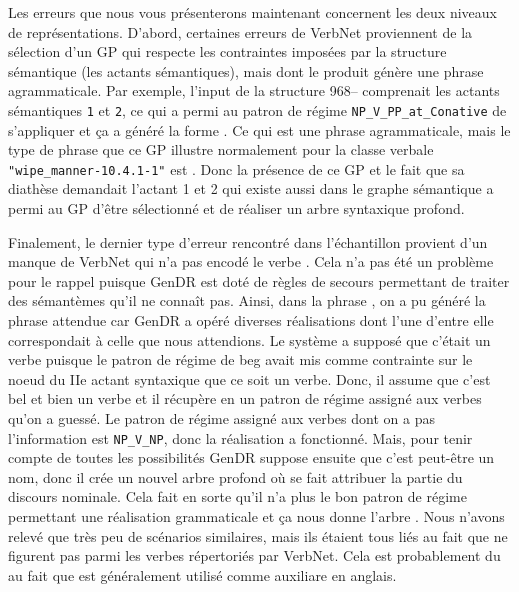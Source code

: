 Les erreurs que nous vous présenterons maintenant concernent les deux niveaux de représentations. D'abord, certaines erreurs de VerbNet proviennent de la sélection d'un \ac{GP} qui respecte les contraintes imposées par la structure sémantique (les actants sémantiques), mais dont le produit génère une phrase agrammaticale. Par exemple, l'input de la structure 968-- comprenait les actants sémantiques \texttt{1} et \texttt{2}, ce qui a permi au patron de régime \texttt{NP\_V\_PP\_at\_Conative} de s'appliquer et ça a généré la forme . Ce qui est une phrase agrammaticale, mais le type de phrase que ce \ac{GP} illustre normalement pour la classe verbale \texttt{"wipe\_manner-10.4.1-1"} est . Donc la présence de ce \ac{GP} et le fait que sa diathèse demandait l'actant 1 et 2 qui existe aussi dans le graphe sémantique a permi au \ac{GP} d'être sélectionné et de réaliser un arbre syntaxique profond.


Finalement, le dernier type d'erreur rencontré dans l'échantillon provient d'un manque de VerbNet qui n'a pas encodé le verbe . Cela n'a pas été un problème pour le rappel puisque GenDR est doté de règles de secours permettant de traiter des sémantèmes qu'il ne connaît pas. Ainsi, dans la phrase , on a pu généré la phrase attendue car GenDR a opéré diverses réalisations dont l'une d'entre elle correspondait à celle que nous attendions. Le système a supposé que c'était un verbe puisque le patron de régime de beg avait mis comme contrainte sur le noeud du IIe actant syntaxique que ce soit un verbe. Donc, il assume que c'est bel et bien un verbe et il récupère en un patron de régime assigné aux verbes qu'on a guessé. Le patron de régime assigné aux verbes dont on a pas l'information est \texttt{NP\_V\_NP}, donc la réalisation a fonctionné. Mais, pour tenir compte de toutes les possibilités GenDR suppose ensuite que c'est peut-être un nom, donc il crée un nouvel arbre profond où  se fait attribuer la partie du discours nominale. Cela fait en sorte qu'il n'a plus le bon patron de régime permettant une réalisation grammaticale et ça nous donne l'arbre . Nous n'avons relevé que très peu de scénarios similaires, mais ils étaient tous liés au fait que  ne figurent pas parmi les verbes répertoriés par VerbNet. Cela est probablement du au fait que  est généralement utilisé comme auxiliare en anglais.

